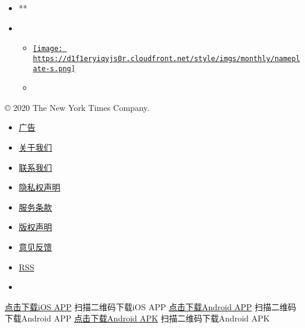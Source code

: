 \begin{itemize}
\item
  **
\item
  \begin{itemize}
  \item
    \href{https://www.shi-magazine.com/}{\texttt{[image: https://d1f1eryiqyjs0r.cloudfront.net/style/imgs/monthly/nameplate-s.png]}}
  \item
  \end{itemize}
\end{itemize}

© 2020 The New York Times Company.

\begin{itemize}
\item
  \href{/help/ad/}{广告}
\item
  \href{/help/about-us/}{关于我们}
\item
  \href{/help/contact/}{联系我们}
\item
  \href{https://help.nytimes.com/hc/en-us/articles/115014892108-Privacy-policy}{隐私权声明}
\item
  \href{/help/tos/}{服务条款}
\item
  \href{/help/copyright-statement/}{版权声明}
\item
  \href{mailto:cn.help@nytimes.com?subject=FEEDBACK}{意见反馈}
\item
  \href{/rss/}{RSS}
\item
\end{itemize}

\href{https://itunes.apple.com/app/apple-store/id807498298?pt=13036\&ct=news-hp\&mt=8}{点击下载iOS
APP} 扫描二维码下载iOS APP
\href{https://play.google.com/store/apps/details?id=com.nytimes.cn}{点击下载Android
APP} 扫描二维码下载Android APP
\href{https://nytcnapps.oss-cn-hongkong.aliyuncs.com/latest.apk}{点击下载Android
APK} 扫描二维码下载Android APK 
